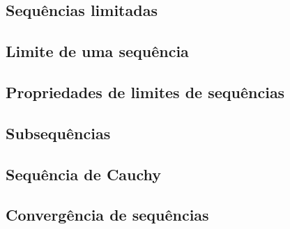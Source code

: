    \subsection{Sequências limitadas}
   \subsection{Limite de uma sequência}
   \subsection{Propriedades de limites de sequências}
   \subsection{Subsequências}
   \subsection{Sequência de Cauchy}

   \subsection{Convergência de sequências}
